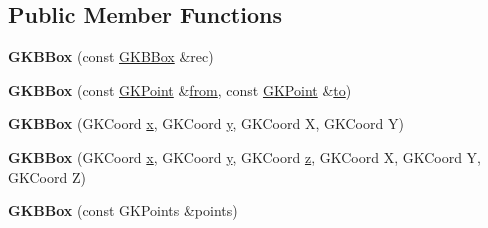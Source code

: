\subsection*{Public Member Functions}
\begin{DoxyCompactItemize}
\item 
{\bfseries G\+K\+B\+Box} (const \hyperlink{classGKBBox}{G\+K\+B\+Box} \&rec)\hypertarget{classGKBBox_a3d26f49e0c483fec1dd355a34e393554}{}\label{classGKBBox_a3d26f49e0c483fec1dd355a34e393554}

\item 
{\bfseries G\+K\+B\+Box} (const \hyperlink{classGKPoint}{G\+K\+Point} \&\hyperlink{classGKBBox_aa5b512feaacc7fab5aa6e84bbe6f106f}{from}, const \hyperlink{classGKPoint}{G\+K\+Point} \&\hyperlink{classGKBBox_af0ec176a4cfaa7731b39858cbb88d6db}{to})\hypertarget{classGKBBox_a783f85af922785e3674ce474c6e72e5b}{}\label{classGKBBox_a783f85af922785e3674ce474c6e72e5b}

\item 
{\bfseries G\+K\+B\+Box} (G\+K\+Coord \hyperlink{classGKBBox_ac607e63172143a23c6c2dfd89a13d1d0}{x}, G\+K\+Coord \hyperlink{classGKBBox_a1e3d663358c16956585b9ef44131fd26}{y}, G\+K\+Coord X, G\+K\+Coord Y)\hypertarget{classGKBBox_aeb9eebe1df57d021831941a5a219bfc0}{}\label{classGKBBox_aeb9eebe1df57d021831941a5a219bfc0}

\item 
{\bfseries G\+K\+B\+Box} (G\+K\+Coord \hyperlink{classGKBBox_ac607e63172143a23c6c2dfd89a13d1d0}{x}, G\+K\+Coord \hyperlink{classGKBBox_a1e3d663358c16956585b9ef44131fd26}{y}, G\+K\+Coord \hyperlink{classGKBBox_ae36232dda9ccdec81abaa8ebc009ccd7}{z}, G\+K\+Coord X, G\+K\+Coord Y, G\+K\+Coord Z)\hypertarget{classGKBBox_ae366bffaf8df7a2e47426553c45a2314}{}\label{classGKBBox_ae366bffaf8df7a2e47426553c45a2314}

\item 
{\bfseries G\+K\+B\+Box} (const G\+K\+Points \&points)\hypertarget{classGKBBox_a93ac777f0364f84aeed3893beeffcd1d}{}\label{classGKBBox_a93ac777f0364f84aeed3893beeffcd1d}


\end{DoxyCompactItemize}
